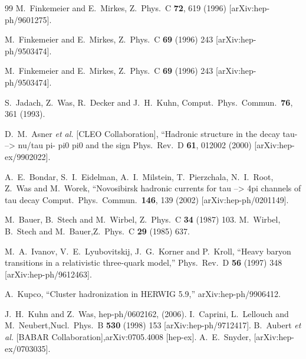 \documentclass{article}
\begin{document}
\begin{thebibliography}{99}
  M.~Finkemeier and E.~Mirkes,
  Z.\ Phys.\  C {\bf 72}, 619 (1996)
  [arXiv:hep-ph/9601275].

M.~Finkemeier and E.~Mirkes,
Z.\ Phys.\  C {\bf 69} (1996) 243 [arXiv:hep-ph/9503474].

M.~Finkemeier and E.~Mirkes,
Z.\ Phys.\  C {\bf 69} (1996) 243 [arXiv:hep-ph/9503474].

  S.~Jadach, Z.~Was, R.~Decker and J.~H.~Kuhn,
  Comput.\ Phys.\ Commun.\  {\bf 76}, 361 (1993).

  D.~M.~Asner {\it et al.}  [CLEO Collaboration],
   ``Hadronic structure in the decay tau- --> nu/tau pi- pi0 pi0 and the  sign
  Phys.\ Rev.\  D {\bf 61}, 012002 (2000)
  [arXiv:hep-ex/9902022].

  A.~E.~Bondar, S.~I.~Eidelman, A.~I.~Milstein, T.~Pierzchala, N.~I.~Root, Z.~Was and M.~Worek,
   ``Novosibirsk hadronic currents for tau --> 4pi channels of tau decay
  Comput.\ Phys.\ Commun.\  {\bf 146}, 139 (2002)
  [arXiv:hep-ph/0201149].

 M.~Bauer, B.~Stech and M.~Wirbel,
Z.\ Phys.\  C {\bf 34} (1987) 103.
 M.~Wirbel, B.~Stech and M.~Bauer,Z.\ Phys.\  C {\bf 29} (1985) 637.

  M.~A.~Ivanov, V.~E.~Lyubovitskij, J.~G.~Korner and P.~Kroll,
  ``Heavy baryon transitions in a relativistic three-quark model,''
  Phys.\ Rev.\  D {\bf 56} (1997) 348
  [arXiv:hep-ph/9612463].

  A.~Kupco,
  ``Cluster hadronization in HERWIG 5.9,''
  arXiv:hep-ph/9906412.

 J.~H.~Kuhn and Z.~Was, hep-ph/0602162, (2006).
 I.~Caprini, L.~Lellouch and M.~Neubert,Nucl.\ Phys.\  B {\bf 530} (1998) 153 [arXiv:hep-ph/9712417].
 B.~Aubert {\it et al.}  [BABAR Collaboration],arXiv:0705.4008 [hep-ex]. %
 A.~E.~Snyder, [arXiv:hep-ex/0703035].


\end{thebibliography}
\end{document}
